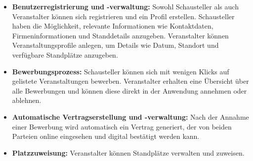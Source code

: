 \begin{itemize}
	\item \textbf{Benutzerregistrierung und -verwaltung:} Sowohl Schausteller als auch Veranstalter können sich registrieren und ein Profil erstellen. Schausteller haben die Möglichkeit, relevante Informationen wie Kontaktdaten, Firmeninformationen und Standdetails anzugeben. Veranstalter können Veranstaltungsprofile anlegen, um Details wie Datum, Standort und verfügbare Standplätze anzugeben.
	
	\item \textbf{Bewerbungsprozess:} Schausteller können sich mit wenigen Klicks auf gelistete Veranstaltungen bewerben. Veranstalter erhalten eine Übersicht über alle Bewerbungen und können diese direkt in der Anwendung annehmen oder ablehnen.
	
	\item \textbf{Automatische Vertragserstellung und -verwaltung:} Nach der Annahme einer Bewerbung wird automatisch ein Vertrag generiert, der von beiden Parteien online eingesehen und digital bestätigt werden kann.
	
	
	\item \textbf{Platzzuweisung:} Veranstalter können Standplätze verwalten und zuweisen.
	
\end{itemize}

